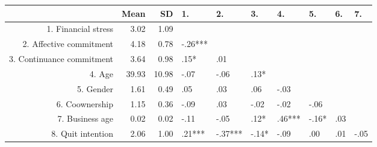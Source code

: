 \begin{table}[ht]
\centering
\begin{tabular}{rrrlllllll}
  \hline
 & Mean & SD & 1. & 2. & 3. & 4. & 5. & 6. & 7. \\ 
  \hline
1. Financial stress & 3.02 & 1.09 &  &  &  &  &  &  &  \\ 
  2. Affective commitment & 4.18 & 0.78 & -.26***  &  &  &  &  &  &  \\ 
  3. Continuance commitment & 3.64 & 0.98 & .15*    & .01     &  &  &  &  &  \\ 
  4. Age & 39.93 & 10.98 & -.07     & -.06     & .13*    &  &  &  &  \\ 
  5. Gender & 1.61 & 0.49 & .05     & .03     & .06     & -.03     &  &  &  \\ 
  6. Coownership & 1.15 & 0.36 & -.09     & .03     & -.02     & -.02     & -.06     &  &  \\ 
  7. Business age & 0.02 & 0.02 & -.11     & -.05     & .12*    & .46***  & -.16*    & .03     &  \\ 
  8. Quit intention & 2.06 & 1.00 & .21***  & -.37***  & -.14*    & -.09     & .00     & .01     & -.05     \\ 
   \hline
\end{tabular}
\end{table}

